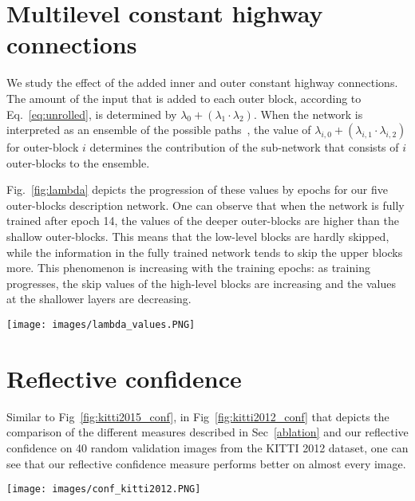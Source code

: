\documentclass[10pt, twocolumn, letterpaper]{article}
\begin{document}
\section{Multilevel constant highway connections}
\label{ap:lambda}
We study the effect of the added inner and outer constant highway connections. The amount of the input that is added to each outer block, according to Eq.~\ref{eq:unrolled}, is determined by $\lambda_0+(\lambda_1 \cdot \lambda_2)$. When the network is interpreted as an ensemble of the possible paths~\cite{Veit2016}, the value of $\lambda_{i,0}+(\lambda_{i,1} \cdot \lambda_{i,2})$ for outer-block $i$ determines the contribution of the sub-network that consists of $i$ outer-blocks to the ensemble. 

Fig.~\ref{fig:lambda} depicts the progression of these values by epochs for our five outer-blocks description network. One can observe that when the network is fully trained after epoch 14, the values of the deeper outer-blocks are higher than the shallow outer-blocks. This means that the low-level blocks are hardly skipped, while the information in the fully trained network tends to skip the upper blocks more. 
This phenomenon is increasing with the training epochs: as training progresses, the skip values of the high-level blocks are increasing and the values at the shallower layers are decreasing.

\begin{figure*}[t]
\centering
  \texttt{[image: images/lambda\_values.PNG]}%
\caption{The values of total skip-connections for each outer clock, i.e. the amount of input that skips each outer-block through the constant highway gates, as a function of the training epochs. }
\label{fig:lambda}
\end{figure*}


\section{Reflective confidence}
\label{ap:conf}
Similar to Fig~\ref{fig:kitti2015_conf}, in Fig~\ref{fig:kitti2012_conf} that depicts the comparison of the different measures described in Sec~\ref{ablation} and our reflective confidence on 40 random validation images from the KITTI 2012 dataset, one can see that our reflective confidence measure performs better on almost every image.

\begin{figure*}[t]
\centering
  \texttt{[image: images/conf\_kitti2012.PNG]}
\caption{AUC of confidence measures on 40 random validation images from the KITTI 2012 stereo data sets, ordered by the reflective confidence score. The reflective confidence (Ref) is shown to outperform the different measures, described in Sec.~\ref{ablation}, on almost every image.}
\label{fig:kitti2012_conf}
\end{figure*}
\end{document}
